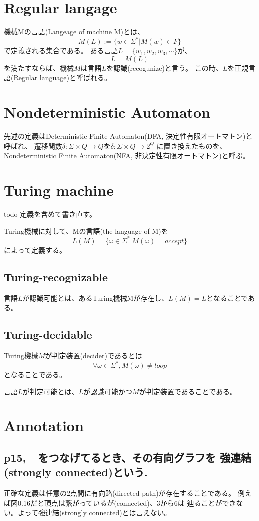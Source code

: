 \documentclass[b5paper,fleqn]{ltjsarticle}
\newcommand\s[1]{\subsection*{#1}\noindent\ignorespaces}
\begin{document}
\section{Regular langage}
機械Mの言語(Langeage of machine M)とは、
\[M(L):=\{w\in \Sigma^*|M(w)\in F\}\]
で定義される集合である。
ある言語$L=\{w_1,w_2,w_3,\cdots\}$が、
\[L=M(L)\]
を満たすならば、機械$M$は言語$L$を認識(recogunize)と言う。
この時、$L$を正規言語(Regular language)と呼ばれる。

\section{Nondeterministic Automaton}
先述の定義はDeterministic Finite Automaton(DFA, 決定性有限オートマトン)と呼ばれ、
遷移関数$\delta:\Sigma\times Q\rightarrow Q$を$\delta:\Sigma\times Q\rightarrow 2^Q$
に置き換えたものを、Nondeterministic Finite Automaton(NFA, 非決定性有限オートマトン)と呼ぶ。

\section{Turing machine}
todo
定義を含めて書き直す。

Turing機械に対して、Mの言語(the language of M)を
\[L(M)=\{\omega\in\Sigma^*|M(\omega)=accept\}\]
によって定義する。
\subsection{Turing-recognizable}
言語$L$が認識可能とは、あるTuring機械Mが存在し、$L(M)=L$となることである。
\subsection{Turing-decidable}
Turing機械$M$が判定装置(decider)であるとは
\[\forall\omega\in\Sigma^*, M(\omega)\neq loop\]
となることである。\par
言語$L$が判定可能とは、$L$が認識可能かつ$M$が判定装置であることである。

\section{Annotation}

\s{p15,---をつなげてるとき、その有向グラフを
強連結(strongly connected)という.}
正確な定義は任意の2点間に有向路(directed path)が存在することである。
例えば図0.16だと頂点は繋がっているが(connected)、3から6は
辿ることができない。よって強連結(strongly connected)とは言えない。
\end{document}
